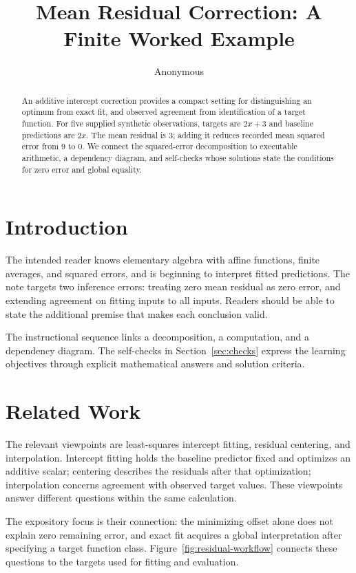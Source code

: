 \documentclass[11pt]{article}
\title{Mean Residual Correction: A Finite Worked Example}
\author{Anonymous}
\date{}
\begin{document}
\raggedbottom
\maketitle

\begin{abstract}
An additive intercept correction provides a compact setting for distinguishing an optimum from exact fit, and observed agreement from identification of a target function. For five supplied synthetic observations, targets are $2x+3$ and baseline predictions are $2x$. The mean residual is $3$; adding it reduces recorded mean squared error from $9$ to $0$. We connect the squared-error decomposition to executable arithmetic, a dependency diagram, and self-checks whose solutions state the conditions for zero error and global equality.
\end{abstract}

\section{Introduction}

The intended reader knows elementary algebra with affine functions, finite averages, and squared errors, and is beginning to interpret fitted predictions. The note targets two inference errors: treating zero mean residual as zero error, and extending agreement on fitting inputs to all inputs. Readers should be able to state the additional premise that makes each conclusion valid.

The instructional sequence links a decomposition, a computation, and a dependency diagram. The self-checks in Section~\ref{sec:checks} express the learning objectives through explicit mathematical answers and solution criteria.

\section{Related Work}

The relevant viewpoints are least-squares intercept fitting, residual centering, and interpolation. Intercept fitting holds the baseline predictor fixed and optimizes an additive scalar; centering describes the residuals after that optimization; interpolation concerns agreement with observed target values. These viewpoints answer different questions within the same calculation.

The expository focus is their connection: the minimizing offset alone does not explain zero remaining error, and exact fit acquires a global interpretation after specifying a target function class. Figure~\ref{fig:residual-workflow} connects these questions to the targets used for fitting and evaluation.
\end{document}
